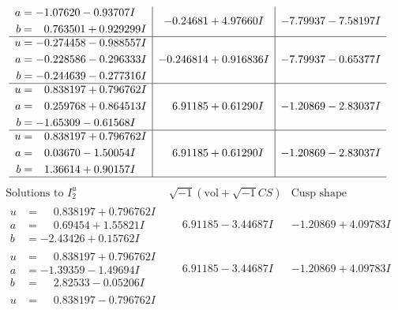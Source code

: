 \documentclass[1p]{elsarticle_modified}
\theoremstyle{definition}
\newcommand{\I}{\sqrt{-1}}
\begin{document}
$$\begin{array}{c|c|c}
\begin{aligned}
a &= -1.07620 - 0.93707 I \\
b &= \phantom{-}0.763501 + 0.929299 I\end{aligned}
 & -0.24681 + 4.97660 I & -7.79937 - 7.58197 I \\ \hline\begin{aligned}
u &= -0.274458 - 0.988557 I \\
a &= -0.228586 - 0.296333 I \\
b &= -0.244639 - 0.277316 I\end{aligned}
 & -0.246814 + 0.916836 I & -7.79937 - 0.65377 I \\ \hline\begin{aligned}
u &= \phantom{-}0.838197 + 0.796762 I \\
a &= \phantom{-}0.259768 + 0.864513 I \\
b &= -1.65309 - 0.61568 I\end{aligned}
 & \phantom{-}6.91185 + 0.61290 I & -1.20869 - 2.83037 I \\ \hline\begin{aligned}
u &= \phantom{-}0.838197 + 0.796762 I \\
a &= \phantom{-}0.03670 - 1.50054 I \\
b &= \phantom{-}1.36614 + 0.90157 I\end{aligned}
 & \phantom{-}6.91185 + 0.61290 I & -1.20869 - 2.83037 I\\
 \hline 
 \end{array}$$\newpage$$\begin{array}{c|c|c}  
\text{Solutions to }I^u_{2}& \I (\text{vol} + \sqrt{-1}CS) & \text{Cusp shape}\\
 \hline 
\begin{aligned}
u &= \phantom{-}0.838197 + 0.796762 I \\
a &= \phantom{-}0.69454 + 1.55821 I \\
b &= -2.43426 + 0.15762 I\end{aligned}
 & \phantom{-}6.91185 - 3.44687 I & -1.20869 + 4.09783 I \\ \hline\begin{aligned}
u &= \phantom{-}0.838197 + 0.796762 I \\
a &= -1.39359 - 1.49694 I \\
b &= \phantom{-}2.82533 - 0.05206 I\end{aligned}
 & \phantom{-}6.91185 - 3.44687 I & -1.20869 + 4.09783 I \\ \hline\begin{aligned}
u &= \phantom{-}0.838197 - 0.796762 I \\

\end{aligned}
\end{array}$$
\end{document}
